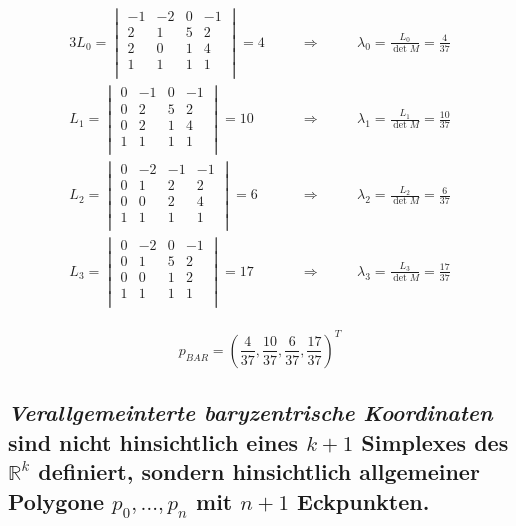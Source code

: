 \documentclass[a4paper,10pt,DIV=14]{scrartcl}
\begin{document}
\begin{alignat*}{3}
	L_0 = \begin{vmatrix}
				-1 & -2 &  0 & -1 \\
			 2 &  1 &  5 &  2 \\
			 2 &  0 &  1 &  4 \\
			 1 &  1 &  1 &  1 \\
			\end{vmatrix} = 4
	& \qquad \Rightarrow \qquad
	& \lambda_0 = \frac{L_0}{\det M} = \frac{4}{37} \\
	L_1 = \begin{vmatrix}
				0 & -1 &  0 & -1 \\
				0 &  2 &  5 &  2 \\
				0 &  2 &  1 &  4 \\
				1 &  1 &  1 &  1 \\
	 	  \end{vmatrix} = 10
	& \qquad \Rightarrow \qquad
	& \lambda_1 = \frac{L_1}{\det M} = \frac{10}{37} \\
	L_2 = \begin{vmatrix}
				0 & -2 & -1 & -1 \\
				0 &  1 &  2 &  2 \\
				0 &  0 &  2 &  4 \\
				1 &  1 &  1 &  1 \\
			\end{vmatrix} = 6
	& \qquad \Rightarrow \qquad
	& \lambda_2 = \frac{L_2}{\det M} = \frac{6}{37} \\
	L_3 = \begin{vmatrix}
				0 & -2 &  0 & -1 \\
				0 &  1 &  5 &  2 \\
				0 &  0 &  1 &  2 \\
				1 &  1 &  1 &  1 \\
			\end{vmatrix} = 17
	& \qquad \Rightarrow \qquad
	& \lambda_3 = \frac{L_3}{\det M} = \frac{17}{37} \\
\end{alignat*}

$$ p_{BAR} = \left( \frac{4}{37}, \frac{10}{37}, \frac{6}{37}, \frac{17}{37} \right)  ^T $$

\subsection{\emph{Verallgemeinterte baryzentrische Koordinaten} sind nicht hinsichtlich eines $k+1$ Simplexes des $\mathbb{R}^k$ definiert, sondern hinsichtlich allgemeiner Polygone $p_0, \dots, p_n$ mit $n+1$ Eckpunkten.}
\end{document}
